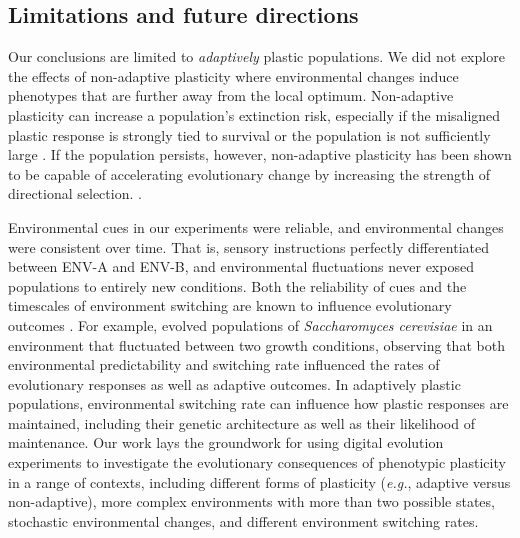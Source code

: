 \vspace{0.25cm}
\subsection{Limitations and future directions}


Our conclusions are limited to \textit{adaptively} plastic populations.
We did not explore the effects of non-adaptive plasticity where environmental changes induce phenotypes that are further away from the local optimum.
Non-adaptive plasticity can increase a population's extinction risk, especially if the misaligned plastic response is strongly tied to survival or the population is not sufficiently large \citep{gomulkiewicz_when_1995,chevin_adaptation_2010}.
If the population persists, however, non-adaptive plasticity has been shown to be capable of accelerating evolutionary change by increasing the strength of directional selection. \citep{ghalambor_non-adaptive_2015}.

Environmental cues in our experiments were reliable, and environmental changes were consistent over time. 
That is, sensory instructions perfectly differentiated between ENV-A and ENV-B, and environmental fluctuations never exposed populations to entirely new conditions.
Both the reliability of cues and the timescales of environment switching are known to influence evolutionary outcomes \citep{li_digital_2004,boyer_adaptation_2021}. %
For example, \cite{boyer_adaptation_2021} evolved populations of \textit{Saccharomyces cerevisiae} in an environment that fluctuated between two growth conditions, observing that both environmental predictability and switching rate influenced the rates of evolutionary responses as well as adaptive outcomes. %
In adaptively plastic populations, environmental switching rate can influence how plastic responses are maintained, including their genetic architecture as well as their likelihood of maintenance. 
Our work lays the groundwork for using digital evolution experiments to investigate the evolutionary consequences of phenotypic plasticity in a range of contexts, including different forms of plasticity (\textit{e.g.}, adaptive versus non-adaptive), more complex environments with more than two possible states, stochastic environmental changes, and different environment switching rates.

